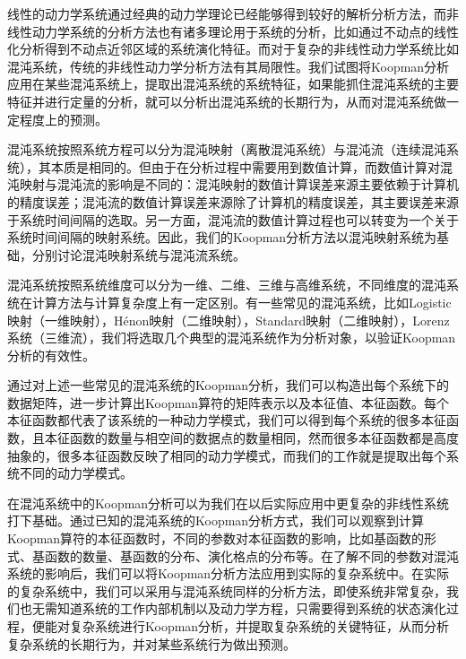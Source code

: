 线性的动力学系统通过经典的动力学理论已经能够得到较好的解析分析方法，而非线性动力学系统的分析方法也有诸多理论用于系统的分析，比如通过不动点的线性化分析得到不动点近邻区域的系统演化特征。而对于复杂的非线性动力学系统比如混沌系统，传统的非线性动力学分析方法有其局限性。我们试图将Koopman分析应用在某些混沌系统上，提取出混沌系统的系统特征，如果能抓住混沌系统的主要特征并进行定量的分析，就可以分析出混沌系统的长期行为，从而对混沌系统做一定程度上的预测。

混沌系统按照系统方程可以分为混沌映射（离散混沌系统）与混沌流（连续混沌系统），其本质是相同的。但由于在分析过程中需要用到数值计算，而数值计算对混沌映射与混沌流的影响是不同的：混沌映射的数值计算误差来源主要依赖于计算机的精度误差；混沌流的数值计算误差来源除了计算机的精度误差，其主要误差来源于系统时间间隔的选取。另一方面，混沌流的数值计算过程也可以转变为一个关于系统时间间隔的映射系统。因此，我们的Koopman分析方法以混沌映射系统为基础，分别讨论混沌映射系统与混沌流系统。

混沌系统按照系统维度可以分为一维、二维、三维与高维系统，不同维度的混沌系统在计算方法与计算复杂度上有一定区别。有一些常见的混沌系统，比如Logistic映射（一维映射），H\'{e}non映射（二维映射），Standard映射（二维映射），Lorenz系统（三维流），我们将选取几个典型的混沌系统作为分析对象，以验证Koopman分析的有效性。

通过对上述一些常见的混沌系统的Koopman分析，我们可以构造出每个系统下的数据矩阵，进一步计算出Koopman算符的矩阵表示以及本征值、本征函数。每个本征函数都代表了该系统的一种动力学模式，我们可以得到每个系统的很多本征函数，且本征函数的数量与相空间的数据点的数量相同，然而很多本征函数都是高度抽象的，很多本征函数反映了相同的动力学模式，而我们的工作就是提取出每个系统不同的动力学模式。

在混沌系统中的Koopman分析可以为我们在以后实际应用中更复杂的非线性系统打下基础。通过已知的混沌系统的Koopman分析方式，我们可以观察到计算Koopman算符的本征函数时，不同的参数对本征函数的影响，比如基函数的形式、基函数的数量、基函数的分布、演化格点的分布等。在了解不同的参数对混沌系统的影响后，我们可以将Koopman分析方法应用到实际的复杂系统中。在实际的复杂系统中，我们可以采用与混沌系统同样的分析方法，即使系统非常复杂，我们也无需知道系统的工作内部机制以及动力学方程，只需要得到系统的状态演化过程，便能对复杂系统进行Koopman分析，并提取复杂系统的关键特征，从而分析复杂系统的长期行为，并对某些系统行为做出预测。

